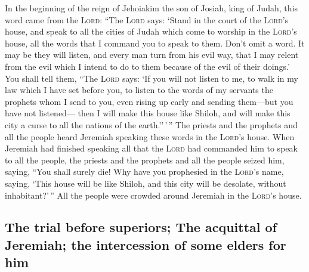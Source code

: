  In the beginning of the reign of Jehoiakim the son of
Josiah, king of Judah, this word came from the \textsc{Lord}:
 ``The \textsc{Lord} says: `Stand in the court of the
\textsc{Lord}'s house, and speak to all the cities of Judah which come
to worship in the \textsc{Lord}'s house, all the words that I command
you to speak to them. Don't omit a word.  It may be they
will listen, and every man turn from his evil way, that I may relent
from the evil which I intend to do to them because of the evil of their
doings.'  You shall tell them, ``The \textsc{Lord} says:
`If you will not listen to me, to walk in my law which I have set before
you,  to listen to the words of my servants the prophets
whom I send to you, even rising up early and sending them---but you have
not listened---  then I will make this house like Shiloh,
and will make this city a curse to all the nations of the
earth.''\,'\,''  The priests and the prophets and all the
people heard Jeremiah speaking these words in the \textsc{Lord}'s house.
 When Jeremiah had finished speaking all that the
\textsc{Lord} had commanded him to speak to all the people, the priests
and the prophets and all the people seized him, saying, ``You shall
surely die!  Why have you prophesied in the
\textsc{Lord}'s name, saying, `This house will be like Shiloh, and this
city will be desolate, without inhabitant?'\,'' All the people were
crowded around Jeremiah in the \textsc{Lord}'s house.

\hypertarget{the-trial-before-superiors-the-acquittal-of-jeremiah-the-intercession-of-some-elders-for-him}{%
\subsection{The trial before superiors; The acquittal of Jeremiah; the
intercession of some elders for
him}\label{the-trial-before-superiors-the-acquittal-of-jeremiah-the-intercession-of-some-elders-for-him}}

